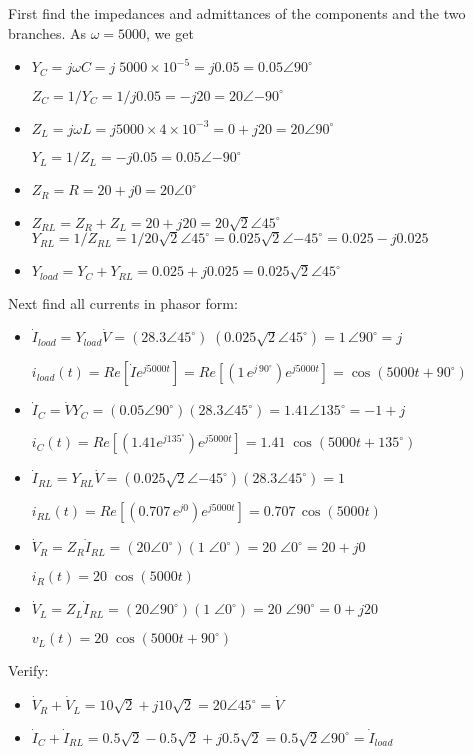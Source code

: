 \documentclass{article}
\begin{document}
First find the impedances and admittances of the components and the 
two branches. As $\omega=5000$, we get
\begin{itemize}
\item $Y_C=j\omega C=j\;5000\times 10^{-5}=j0.05=0.05\angle{90^\circ}$

	$Z_C=1/Y_C=1/j0.05=-j20=20\angle{-90^\circ}$
\item $Z_L=j\omega L=j5000\times 4\times 10^{-3}=0+j20=20\angle{90^\circ}$

	$Y_L=1/Z_L=-j0.05=0.05\angle{-90^\circ}$
\item $Z_R=R=20+j0=20\angle{0^\circ}$

\item $Z_{RL}=Z_R+Z_L=20+j20=20\sqrt{2}\angle{45^\circ}$
	$Y_{RL}=1/Z_{RL}=1/20\sqrt{2}\angle{45^\circ}
	=0.025\sqrt{2}\angle{-45^\circ}=0.025-j0.025$

\item $Y_{load}=Y_C+Y_{RL}=0.025+j0.025=0.025\sqrt{2}\angle{45^\circ}$
\end{itemize}
Next find all currents in phasor form:
\begin{itemize}
\item $\dot{I}_{load}=Y_{load}\dot{V}=(28.3\angle{45^\circ})\;
  (0.025\sqrt{2}\angle{45^\circ})=1\,\angle{90^\circ}=j$

  $i_{load}(t)=Re[\dot{I} e^{j5000t}]=Re[(1\,e^{j\,90^\circ}) e^{j5000t}]
  =\cos(5000t+90^\circ)$
\item $\dot{I}_C=\dot{V}Y_C=(0.05\angle{90^\circ})(28.3\angle{45^\circ})
  =1.41\angle{135^\circ}=-1+j$  

  $i_C(t)=Re[ (1.41 e^{j 135^\circ}) e^{j5000t}]=1.41\;\cos(5000t+135^\circ)$

\item $\dot{I}_{RL}=Y_{RL}\dot{V}=(0.025\sqrt{2}\angle{-45^\circ})(28.3\angle{45^\circ})
  =1$

  $i_{RL}(t)=Re[ (0.707\,e^{j0}) e^{j5000t} ]=0.707\,\cos(5000t)$

\item $\dot{V}_R=Z_R\dot{I}_{RL}=(20\angle{0^\circ})(1\;\angle{0^\circ})
  =20\;\angle{0^\circ}=20+j0$
        
  $i_R(t)=20\;\cos(5000t)$

\item $\dot{V}_L=Z_L\dot{I}_{RL}=(20\angle{90^\circ})(1\;\angle{0^\circ})
  =20\;\angle{90^\circ}=0+j20$

  $v_L(t)=20\;\cos(5000t+90^\circ)$
\end{itemize}
Verify: 
\begin{itemize}
\item $\dot{V}_R+\dot{V}_L=10\sqrt{2}+j10\sqrt{2}=20\angle{45^\circ}
	=\dot{V}$
\item $\dot{I}_C+\dot{I}_{RL}=0.5\sqrt{2}-0.5\sqrt{2}+j0.5\sqrt{2}
	=0.5\sqrt{2}\angle{90^\circ}=\dot{I}_{load}$
\end{itemize}
\end{document}
